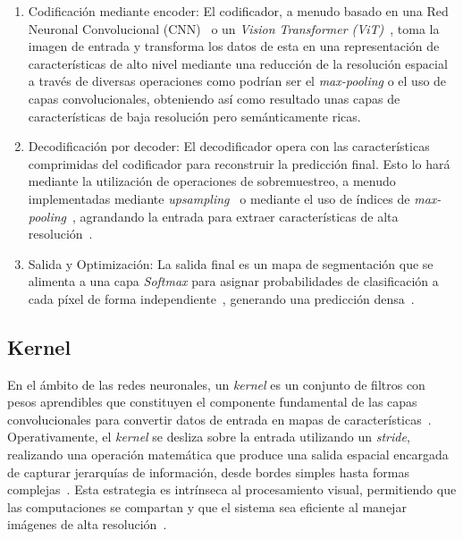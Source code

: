 \begin{enumerate}
	\item Codificación mediante encoder:
	El codificador, a menudo basado en una Red Neuronal Convolucional (CNN)~\cite{visionencoder2025} o un \textit{Vision Transformer (ViT)}~\cite{bala2025visiontranscoder}, toma la imagen de entrada y transforma los datos de esta en una representación de características de alto nivel mediante una reducción de la resolución espacial a través de diversas operaciones como podrían ser el \textit{max-pooling} o el uso de capas convolucionales, obteniendo así como resultado unas capas de características de baja resolución pero semánticamente ricas.
	
	\item Decodificación por decoder: El decodificador opera con las características comprimidas del codificador para reconstruir la predicción final. Esto lo hará mediante la utilización de operaciones de sobremuestreo, a menudo implementadas mediante \textit{upsampling}~\cite{badrinarayanan2016segnet, lin2017fpn} o mediante el uso de índices de \textit{max-pooling}~\cite{neloy2024autoencoders, zhang2022constructionautomation}, agrandando la entrada para extraer características de alta resolución~\cite{neloy2024autoencoders, ji2022automation, badrinarayanan2016segnet}.
	
	\item Salida y Optimización: La salida final es un mapa de segmentación que se alimenta a una capa \textit{Softmax} para asignar probabilidades de clasificación a cada píxel de forma independiente~\cite{ji2022automation, bala2025visiontranscoder, neloy2024autoencoders}, generando una predicción densa~\cite{neloy2024autoencoders, bala2025visiontranscoder}.
\end{enumerate}

\subsection{Kernel}
En el ámbito de las redes neuronales, un \textit{kernel} es un conjunto de filtros con pesos aprendibles que constituyen el componente fundamental de las capas convolucionales para convertir datos de entrada en mapas de características~\cite{ji2022automation}. Operativamente, el \textit{kernel} se desliza sobre la entrada utilizando un \textit{stride}, realizando una operación matemática que produce una salida espacial encargada de capturar jerarquías de información, desde bordes simples hasta formas complejas~\cite{he2016resnet, ji2022automation, liu2022convnext}. Esta estrategia es intrínseca al procesamiento visual, permitiendo que las computaciones se compartan y que el sistema sea eficiente al manejar imágenes de alta resolución~\cite{liu2022convnext}.

